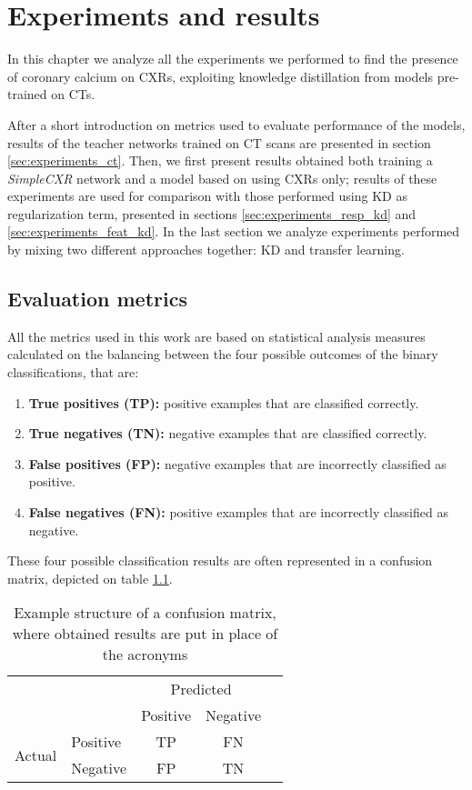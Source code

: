 \chapter{Experiments and results}\label{sec:experiments}
In this chapter we analyze all the experiments we performed to find the presence of coronary calcium on CXRs, exploiting knowledge distillation from models pre-trained on CTs.

After a short introduction on metrics used to evaluate performance of the models, results of the teacher networks trained on CT scans are presented in section \ref{sec:experiments_ct}.
Then, we first present results obtained both training a \emph{SimpleCXR} network and a model based on \cite{iodice_2022} using CXRs only; results of these experiments are used for comparison with those performed using KD as regularization term, presented in sections \ref{sec:experiments_resp_kd} and \ref{sec:experiments_feat_kd}.
In the last section we analyze experiments performed by mixing two different approaches together: KD and transfer learning.


\section{Evaluation metrics}

All the metrics used in this work are based on statistical analysis measures calculated on the balancing between the four possible outcomes of the binary classifications, that are:
\begin{enumerate}
    \item \textbf{True positives (TP):} positive examples that are classified correctly.
    \item \textbf{True negatives (TN):} negative examples that are classified correctly.
    \item \textbf{False positives (FP):} negative examples that are incorrectly classified as positive.
    \item \textbf{False negatives (FN):} positive examples that are incorrectly classified as negative.
\end{enumerate}

These four possible classification results are often represented in a confusion matrix, depicted on table \ref{tab:confusion_matrix}.

\begin{table}
    \centering
    \begin{tabular}{l|l|c|c|c}
        \multicolumn{2}{c}{}&\multicolumn{2}{c}{Predicted} & \hspace{2.5em} \\
        \cline{3-4}
        \multicolumn{2}{c|}{}& Positive & Negative & \\
        \cline{2-4}
        \multirow{2}{*}{Actual}& Positive & TP & FN & \\
        \cline{2-4}
        & Negative & FP & TN & \\
        \cline{2-4}
    \end{tabular}
    \caption{Example structure of a confusion matrix, where obtained results are put in place of the acronyms}
    \label{tab:confusion_matrix}
\end{table}


